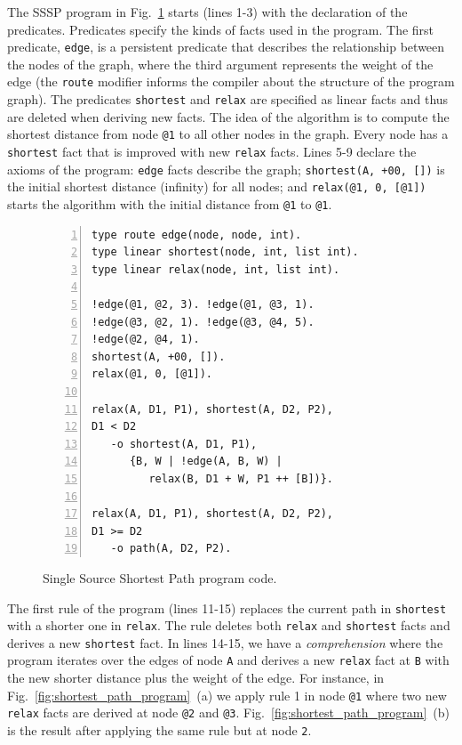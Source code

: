 The SSSP program in Fig.~\ref{code:shortest_path_program} starts (lines 1-3)
with the declaration of the predicates. Predicates specify the kinds of facts
used in the program. The first predicate, \texttt{edge}, is a persistent
predicate that describes the
relationship between the nodes of the graph, where the third argument represents
the weight of the edge
(the \texttt{route} modifier informs the compiler about the structure of the
program graph). The predicates \texttt{shortest} and \texttt{relax} are specified
as linear facts and thus are deleted when deriving new facts.
The idea of the algorithm is to compute the shortest distance from node
\texttt{@1} to all other nodes in the graph. Every node has a \texttt{shortest}
fact that is improved with new \texttt{relax} facts.
Lines 5-9 declare the axioms of the program: \texttt{edge} facts describe the
graph; \texttt{shortest(A, +00, [])} is the initial shortest distance (infinity)
for all nodes; and \texttt{relax(@1, 0, [@1])} starts the algorithm with the
initial distance from \texttt{@1} to \texttt{@1}.

\begin{figure}[h!]
\scriptsize\begin{Verbatim}[numbers=left]
type route edge(node, node, int).
type linear shortest(node, int, list int).
type linear relax(node, int, list int).

!edge(@1, @2, 3). !edge(@1, @3, 1).
!edge(@3, @2, 1). !edge(@3, @4, 5).
!edge(@2, @4, 1).
shortest(A, +00, []).
relax(@1, 0, [@1]).

relax(A, D1, P1), shortest(A, D2, P2),
D1 < D2
   -o shortest(A, D1, P1),
      {B, W | !edge(A, B, W) |
         relax(B, D1 + W, P1 ++ [B])}.

relax(A, D1, P1), shortest(A, D2, P2),
D1 >= D2
   -o path(A, D2, P2).
\end{Verbatim}
  \caption{Single Source Shortest Path program code.}
  \label{code:shortest_path_program}
\end{figure}
\normalsize

The first rule of the program (lines 11-15) replaces the current path in
\texttt{shortest} with a shorter one in \texttt{relax}. The rule deletes both
\texttt{relax} and \texttt{shortest} facts and derives a new \texttt{shortest}
fact. In lines 14-15, we have a \emph{comprehension} where the program iterates
over the edges of node \texttt{A} and derives a new \texttt{relax} fact at
\texttt{B} with the new shorter distance plus the weight of the edge. For
instance, in Fig.~\ref{fig:shortest_path_program}~(a) we apply rule 1 in node
\texttt{@1} where two new \texttt{relax} facts are derived at node \texttt{@2}
and \texttt{@3}. Fig.~\ref{fig:shortest_path_program}~(b) is the result after
applying the same rule but at node \texttt{2}.

